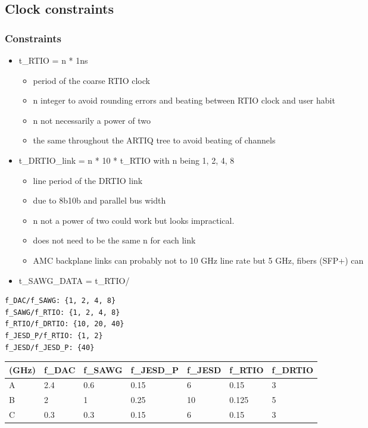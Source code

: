 \subsection{Clock constraints}\label{clock-constraints}

\subsubsection{Constraints}\label{constraints}

\begin{itemize}

	\item
	t\_RTIO = n * 1ns
	
	\begin{itemize}

		\item
		period of the coarse RTIO clock
		\item
		n integer to avoid rounding errors and beating between RTIO clock
		and user habit
		\item
		n not necessarily a power of two
		\item
		the same throughout the ARTIQ tree to avoid beating of channels
	\end{itemize}
	\item
	t\_DRTIO\_link = n * 10 * t\_RTIO with n being 1, 2, 4, 8
	
	\begin{itemize}

		\item
		line period of the DRTIO link
		\item
		due to 8b10b and parallel bus width
		\item
		n not a power of two could work but looks impractical.
		\item
		does not need to be the same n for each link
		\item
		AMC backplane links can probably not to 10 GHz line rate but 5 GHz,
		fibers (SFP+) can
	\end{itemize}
	\item
	t\_SAWG\_DATA = t\_RTIO/
\end{itemize}

\begin{verbatim}
f_DAC/f_SAWG: {1, 2, 4, 8}
f_SAWG/f_RTIO: {1, 2, 4, 8}
f_RTIO/f_DRTIO: {10, 20, 40}
f_JESD_P/f_RTIO: {1, 2}
f_JESD/f_JESD_P: {40}
\end{verbatim}

\begin{longtable}[]{@{}lllllll@{}}

	(GHz) & f\_DAC & f\_SAWG & f\_JESD\_P & f\_JESD & f\_RTIO &
	f\_DRTIO\tabularnewline

	\endhead
	A & 2.4 & 0.6 & 0.15 & 6 & 0.15 & 3\tabularnewline
	B & 2 & 1 & 0.25 & 10 & 0.125 & 5\tabularnewline
	C & 0.3 & 0.3 & 0.15 & 6 & 0.15 & 3\tabularnewline

\end{longtable}

